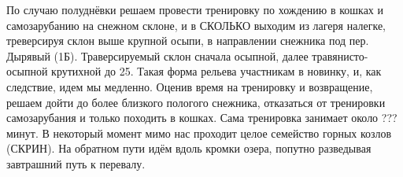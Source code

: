 По случаю полуднёвки решаем провести тренировку по хождению в кошках и самозарубанию на снежном склоне, и в \alert{СКОЛЬКО} выходим из лагеря налегке, треверсируя склон выше крупной осыпи, в направлении снежника под пер. Дырявый (1Б). Траверсируемый склон сначала осыпной, далее травянисто-осыпной крутихной до 25\degree. Такая форма рельева участникам в новинку, и, как следствие, идем мы медленно. Оценив время на тренировку и возвращение, решаем дойти до более близкого пологого снежника, отказаться от тренировки самозарубания и только походить в кошках. Сама тренировка занимает около ??? минут. В некоторый момент мимо нас проходит целое семейство горных козлов (СКРИН).
На обратном пути идём вдоль кромки озера, попутно разведывая завтрашний путь к перевалу.


\newpage